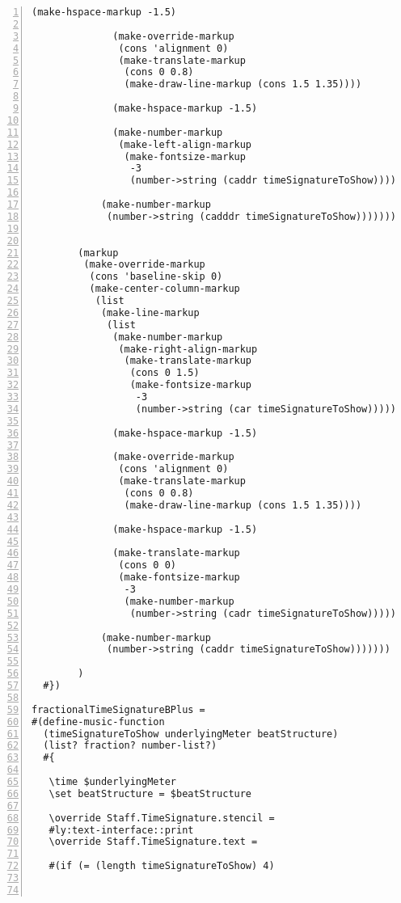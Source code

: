 \begin{Verbatim}[numbers=left,xleftmargin=5mm]
              (make-hspace-markup -1.5)

              (make-override-markup
               (cons 'alignment 0)
               (make-translate-markup
                (cons 0 0.8)
                (make-draw-line-markup (cons 1.5 1.35))))

              (make-hspace-markup -1.5)

              (make-number-markup
               (make-left-align-markup
                (make-fontsize-markup
                 -3
                 (number->string (caddr timeSignatureToShow)))))))

            (make-number-markup
             (number->string (cadddr timeSignatureToShow)))))))


        (markup
         (make-override-markup
          (cons 'baseline-skip 0)
          (make-center-column-markup
           (list
            (make-line-markup
             (list
              (make-number-markup
               (make-right-align-markup
                (make-translate-markup
                 (cons 0 1.5)
                 (make-fontsize-markup
                  -3
                  (number->string (car timeSignatureToShow))))))

              (make-hspace-markup -1.5)

              (make-override-markup
               (cons 'alignment 0)
               (make-translate-markup
                (cons 0 0.8)
                (make-draw-line-markup (cons 1.5 1.35))))

              (make-hspace-markup -1.5)

              (make-translate-markup
               (cons 0 0)
               (make-fontsize-markup
                -3
                (make-number-markup
                 (number->string (cadr timeSignatureToShow)))))))

            (make-number-markup
             (number->string (caddr timeSignatureToShow)))))))

        )
  #})

fractionalTimeSignatureBPlus =
#(define-music-function
  (timeSignatureToShow underlyingMeter beatStructure)
  (list? fraction? number-list?)
  #{

   \time $underlyingMeter
   \set beatStructure = $beatStructure

   \override Staff.TimeSignature.stencil =
   #ly:text-interface::print
   \override Staff.TimeSignature.text =

   #(if (= (length timeSignatureToShow) 4)



\end{Verbatim}
